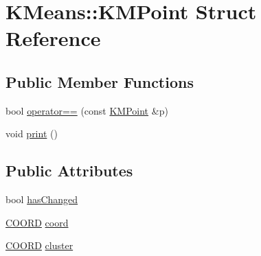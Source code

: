 \hypertarget{structKMeans_1_1KMPoint}{\section{K\-Means\-:\-:K\-M\-Point Struct Reference}
\label{structKMeans_1_1KMPoint}
}
\subsection*{Public Member Functions}
\begin{DoxyCompactItemize}
\item 
bool \hyperlink{structKMeans_1_1KMPoint_ab53a3d1cd3371f64b6f93e5d78f5d4af}{operator==} (const \hyperlink{structKMeans_1_1KMPoint}{K\-M\-Point} \&p)
\item 
void \hyperlink{structKMeans_1_1KMPoint_acb526302b4d5be0799b1ff0fae5839bb}{print} ()
\end{DoxyCompactItemize}
\subsection*{Public Attributes}
\begin{DoxyCompactItemize}
\item 
bool \hyperlink{structKMeans_1_1KMPoint_a1408906e8776055f7545667fddbbe7cb}{has\-Changed}
\item 
\hyperlink{namespaceKMeans_a32ce08f4c8b30171faaeff5a3a466f30}{C\-O\-O\-R\-D} \hyperlink{structKMeans_1_1KMPoint_a403beb1516f02ed1ba0aeca37ba468fa}{coord}
\item 
\hyperlink{namespaceKMeans_a32ce08f4c8b30171faaeff5a3a466f30}{C\-O\-O\-R\-D} \hyperlink{structKMeans_1_1KMPoint_a408c13908634cfcef55d6ff8457adb6b}{cluster}
\end{DoxyCompactItemize}


